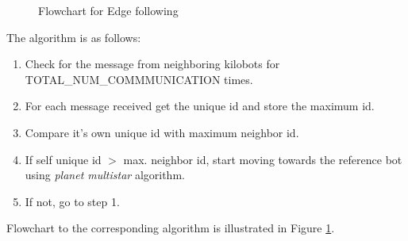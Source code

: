 \documentclass{report}[12pt]
\begin{document}
\begin{figure}[H]
	\centering
	\caption{Flowchart for Edge following}
	\label{fig:Flowchart for Edge following}
\end{figure}

The algorithm is as follows:
\begin{enumerate}
    \item Check for the message from neighboring kilobots for TOTAL\_NUM\_COMMMUNICATION times.
    \item For each message received get the unique id and store the maximum id.
    \item Compare it's own unique id with maximum neighbor id.
    \item If self unique id $>$ max. neighbor id, start moving towards the reference bot using {\textit{planet multistar}} algorithm.
    \item If not, go to step 1.
\end{enumerate}
Flowchart to the corresponding algorithm is illustrated in Figure \ref{fig:Flowchart for Edge following}.
\end{document}
